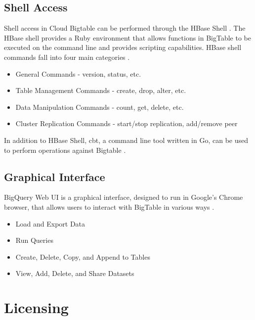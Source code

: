 \documentclass[9pt,twocolumn,twoside]{styles/osajnl}
\begin{document}
\subsection{Shell Access}


Shell access in Cloud Bigtable can be performed through the HBase Shell \cite{www-hbaseshell}. The HBase shell provides a Ruby environment that allows functions in BigTable to be executed on the command line and provides scripting capabilities. HBase shell commands fall into four main categories \cite{www-hbaseshell2}.

\vspace{-\topsep}
\begin{itemize}
\item General Commands - version, status, etc.
\item Table Management Commands - create, drop, alter, etc.
\item Data Manipulation Commands - count, get, delete, etc.
\item Cluster Replication Commands - start/stop replication, add/remove peer 
\end{itemize}
\vspace{-\topsep}

In addition to HBase Shell, cbt, a command line tool written in Go, can be used to perform operations against Bigtable \cite{www-cbt}. 


\subsection{Graphical Interface}

BigQuery Web UI is a graphical interface, designed to run in Google's Chrome browser, that allows users to interact with BigTable in various ways \cite{www-bigquerywebui}.

\vspace{-\topsep}
\begin{itemize}
\item Load and Export Data
\item Run Queries
\item Create, Delete, Copy, and Append to Tables 
\item View, Add, Delete, and Share Datasets 
\end{itemize}
\vspace{-\topsep}


\section{Licensing}
\end{document}
